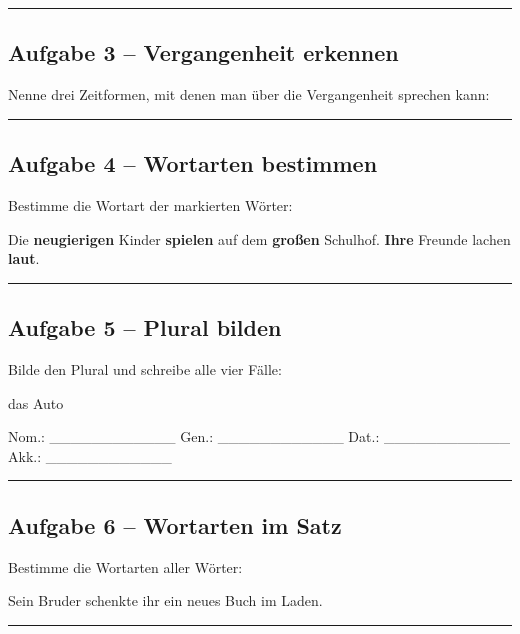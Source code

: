 \documentclass[a4paper,12pt]{article}
\newcommand{\linie}{\vspace{4pt}\hrule\vspace{10pt}}
\begin{document}
\linie

\subsection*{Aufgabe 3 – Vergangenheit erkennen}

Nenne drei Zeitformen, mit denen man über die Vergangenheit sprechen kann:

\vspace{20pt}

\linie

\subsection*{Aufgabe 4 – Wortarten bestimmen}

Bestimme die Wortart der markierten Wörter:

Die \textbf{neugierigen} Kinder \textbf{spielen} auf dem \textbf{großen} Schulhof.  
\textbf{Ihre} Freunde lachen \textbf{laut}.  

\vspace{10pt}

\linie

\subsection*{Aufgabe 5 – Plural bilden}

Bilde den Plural und schreibe alle vier Fälle:

das Auto

Nom.: \_\_\_\_\_\_\_\_\_\_\_\_  
Gen.: \_\_\_\_\_\_\_\_\_\_\_\_  
Dat.: \_\_\_\_\_\_\_\_\_\_\_\_  
Akk.: \_\_\_\_\_\_\_\_\_\_\_\_  

\linie

\subsection*{Aufgabe 6 – Wortarten im Satz}

Bestimme die Wortarten aller Wörter:

Sein Bruder schenkte ihr ein neues Buch im Laden.

\vspace{20pt}

\linie

\end{document}
